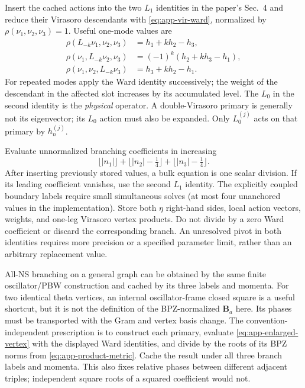 Insert the cached actions into the two $L_1$ identities in the paper's
Sec.~4 and reduce their Virasoro descendants with
\eqref{eq:app-vir-ward}, normalized by
$\rho(\nu_1,\nu_2,\nu_3)=1$. Useful one-mode values are
\begin{align}
 \rho(L_{-k}\nu_1,\nu_2,\nu_3)&=h_1+kh_2-h_3,\nonumber\\
 \rho(\nu_1,L_{-k}\nu_2,\nu_3)&=(-1)^k(h_2+kh_3-h_1),\nonumber\\
 \rho(\nu_1,\nu_2,L_{-k}\nu_3)&=h_3+kh_2-h_1.
 \label{eq:app-single-vir-mode}
\end{align}
For repeated modes apply the Ward identity successively; the weight of
the descendant in the affected slot increases by its accumulated level.
The $L_0$ in the second identity is the \emph{physical} operator.
A double-Virasoro primary is generally not its eigenvector;
its $L_0$ action must also be expanded. Only $L_0^{(j)}$ acts on that
primary by $h_n^{(j)}$.

Evaluate unnormalized branching coefficients in increasing
\begin{equation}
 \lfloor|n_1|\rfloor+\lfloor|n_2|-\tfrac14\rfloor
                         +\lfloor|n_3|-\tfrac14\rfloor.
 \label{eq:app-branch-height}
\end{equation}
After inserting previously stored values, a bulk equation is one scalar
division. If its leading coefficient vanishes, use the second $L_1$
identity. The explicitly coupled boundary
labels require small simultaneous solves (at most four unanchored values
in the implementation). Store both $\eta$ right-hand sides, local action
vectors, weights, and one-leg Virasoro vertex products. Do not divide by
a zero Ward coefficient or discard the corresponding branch.
An unresolved pivot in both identities requires more precision or a
specified parameter limit, rather than an arbitrary replacement value.

All-NS branching on a general graph can be obtained by the same finite
oscillator/PBW construction and cached by its three labels and momenta.
For two identical theta vertices, an internal oscillator-frame
closed square is a useful shortcut, but it is not the definition
of the BPZ-normalized $\mathbf B_a$ here. Its phases must be
transported with the Gram and vertex basis change. The
convention-independent prescription is to construct each primary,
evaluate \eqref{eq:app-enlarged-vertex} with the displayed Ward
identities, and divide by the roots of its BPZ norms from
\eqref{eq:app-product-metric}. Cache the result under all three
branch labels and momenta. This also fixes relative phases between
different adjacent triples; independent square roots of a squared
coefficient would not.

